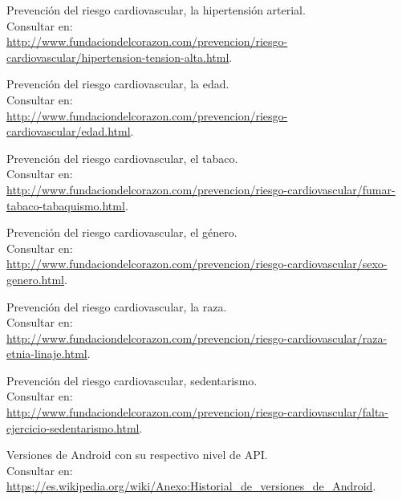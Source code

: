 \documentclass[11pt,spanish,
		listoftables,listoffigures]
		{tfgplantilla}
\begin{document}
\begin{thebibliography}{10}
   Prevención del riesgo cardiovascular, la hipertensión arterial.\\
   \newblock Consultar en:\\
   \url{ http://www.fundaciondelcorazon.com/prevencion/riesgo-cardiovascular/hipertension-tension-alta.html}.

   Prevención del riesgo cardiovascular, la edad.\\
   \newblock Consultar en:\\
   \url{ http://www.fundaciondelcorazon.com/prevencion/riesgo-cardiovascular/edad.html}.

   Prevención del riesgo cardiovascular, el tabaco.\\
   \newblock Consultar en:\\
   \url{ http://www.fundaciondelcorazon.com/prevencion/riesgo-cardiovascular/fumar-tabaco-tabaquismo.html}.

   Prevención del riesgo cardiovascular, el género.\\
   \newblock Consultar en:\\
   \url{ http://www.fundaciondelcorazon.com/prevencion/riesgo-cardiovascular/sexo-genero.html}.

   Prevención del riesgo cardiovascular, la raza.\\
   \newblock Consultar en:\\
   \url{ http://www.fundaciondelcorazon.com/prevencion/riesgo-cardiovascular/raza-etnia-linaje.html}.

   Prevención del riesgo cardiovascular, sedentarismo.\\
   \newblock Consultar en:\\
   \url{ http://www.fundaciondelcorazon.com/prevencion/riesgo-cardiovascular/falta-ejercicio-sedentarismo.html}.

  Versiones de Android con su respectivo nivel de API.\\
   \newblock Consultar en:\\
   \url{ https://es.wikipedia.org/wiki/Anexo:Historial_de_versiones_de_Android}.

\end{thebibliography}

\cleardoublepage
\end{document}
